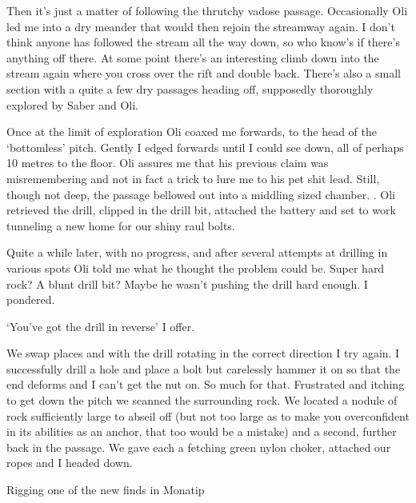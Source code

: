 Then it's  just a matter of following the thrutchy vadose passage. Occasionally Oli led me into a dry meander that would then rejoin the streamway again. I don't think anyone has followed the stream all the way down, so who know's if there's anything off there. At some point there's an interesting climb down into the stream again where you cross over the rift and double back. There's also a small section with a quite a few dry passages heading off, supposedly thoroughly explored by Saber and Oli. 
 
Once at the limit of exploration Oli coaxed me forwards, to the head of the `bottomless' pitch. Gently I edged forwards until I could see down, all of perhaps 10 metres to the floor. Oli assures me that his previous claim was misremembering and not in fact a trick to lure me to his pet shit lead. Still, though not deep, the passage bellowed out into a middling sized chamber. . Oli retrieved the drill, clipped in the drill bit, attached the battery and set to work tunneling a new home for our shiny raul bolts. 
 
Quite a while later, with no progress, and after several attempts at drilling in various spots  Oli told me what he thought the problem could be. Super hard rock? A blunt drill bit? Maybe he wasn't pushing the drill hard enough. I pondered. 

`You've got the drill in reverse' I offer. 





We swap places and with the drill rotating in the correct direction I try again. I successfully drill a hole and place a bolt but carelessly hammer it on so that the end deforms and I can't get the nut on. So much for that. Frustrated and itching to get down the pitch we scanned the surrounding rock. We located a nodule of rock sufficiently large to abseil off (but not too large as to make you overconfident in its abilities as an anchor, that too would be a mistake) and a second, further back in the passage. We gave each a fetching green nylon choker, attached our ropes and I headed down.
 
 
 \begin{marginfigure}
\centering
{}
\label{Monatip-rigging}
\caption{Rigging one of the new finds in Monatip }
\end{marginfigure}

